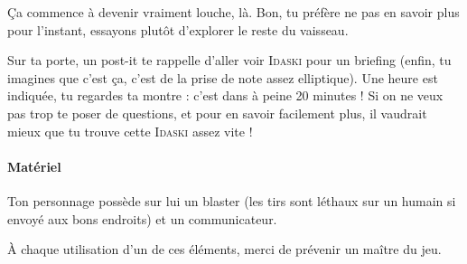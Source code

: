 \documentclass{article}
\begin{document}
{{Ça commence à devenir vraiment louche, là.
Bon, tu préfère ne pas en savoir plus pour l’instant, essayons plutôt d’explorer le reste du vaisseau.

Sur ta porte, un post-it te rappelle d’aller voir \textsc{Idaski} pour un briefing (enfin, tu imagines que c’est ça, c’est de la prise de note assez elliptique).
Une heure est indiquée, tu regardes ta montre : c’est dans à peine 20 minutes !
Si on ne veux pas trop te poser de questions, et pour en savoir facilement plus, il vaudrait mieux que tu trouve cette \textsc{Idaski} assez vite !
}

\paragraph{Matériel}
{
Ton personnage possède sur lui un blaster (les tirs sont léthaux sur un humain si envoyé aux bons endroits) et un communicateur.

À chaque utilisation d’un de ces éléments, merci de prévenir un maître du jeu.
}
}
\end{document}
